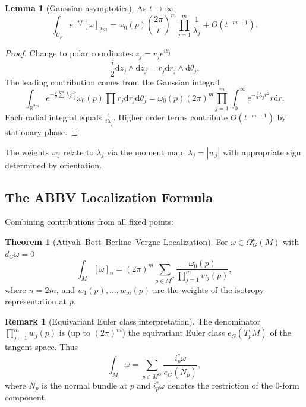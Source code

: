 \documentclass[10pt]{article}
\theoremstyle{definition}
\newtheorem{theorem}[definition]{Theorem}
\newtheorem{lemma}[definition]{Lemma}
\newtheorem{remark}[definition]{Remark}
\newcommand{\diff}{\mathrm{d}}
\newcommand{\R}{\mathbb{R}}
\begin{document}
\begin{lemma}[Gaussian asymptotics]
As $t \to \infty$
\begin{equation}\label{eq:local-contribution}
    \int_{U_p} e^{-tf} [\omega]_{2m} = \omega_0(p) \left(\frac{2\pi}{t}\right)^m \prod_{j=1}^{m} \frac{1}{\lambda_j} + O(t^{-m-1}).
\end{equation}
\end{lemma}
\begin{proof}
Change to polar coordinates $z_j = r_j e^{i\theta_j}$
\begin{equation}
\frac{i}{2} \diff z_j \wedge \diff\bar{z}_j = r_j \diff r_j \wedge \diff\theta_j.
\end{equation}
The leading contribution comes from the Gaussian integral
\begin{equation}
\int_{\R^{2m}} e^{-\frac{t}{2}\sum \lambda_j r_j^2} \omega_0(p) \prod r_j \diff r_j \diff\theta_j = \omega_0(p) (2\pi)^m \prod_{j=1}^m \int_0^\infty e^{-\frac{t}{2}\lambda_j r^2} r \diff r.
\end{equation}
Each radial integral equals $\frac{1}{t\lambda_j}$. Higher order terms contribute $O(t^{-m-1})$ by stationary phase.
\end{proof}

The weights $w_j$ relate to $\lambda_j$ via the moment map: $\lambda_j = |w_j|$ with appropriate sign determined by orientation.

\subsection{The ABBV Localization Formula}\label{subsec:abbv-formula}
Combining contributions from all fixed points:

\begin{theorem}[Atiyah--Bott--Berline--Vergne Localization]
For $\omega \in \Omega_G^{n}(M)$ with $d_G\omega = 0$
\begin{equation}\label{eq:abbv}
    \int_{M} [\omega]_{n} = (2\pi)^{m} \sum_{p \in M^{G}} \frac{\omega_0(p)}{\prod_{j=1}^{m} w_j(p)},
\end{equation}
where $n=2m$, and $w_1(p), \dots, w_m(p)$ are the weights of the isotropy representation at $p$.
\end{theorem}

\begin{remark}[Equivariant Euler class interpretation]
The denominator $\prod_{j=1}^m w_j(p)$ is (up to $(2\pi)^m$) the equivariant Euler class $e_G(T_p M)$ of the tangent space. Thus
\begin{equation}
\int_M \omega = \sum_{p \in M^G} \frac{i_p^*\omega}{e_G(N_p)},
\end{equation}
where $N_p$ is the normal bundle at $p$ and $i_p^*\omega$ denotes the restriction of the 0-form component.
\end{remark}
\end{document}
